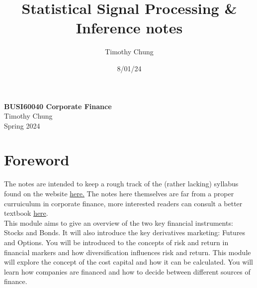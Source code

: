 \documentclass{report}
\title{Statistical Signal Processing \& Inference notes}
\author{Timothy Chung}
\date{8/01/24}
\begin{document}

\setlength{\cftsecnumwidth}{4.2em} 

\begin{titlepage}
\centering
    \vspace*{1cm}
    \Huge
    \textbf{BUSI60040 Corporate Finance} \\
    \vspace{1cm}
    \Large
    Timothy Chung \\
    \vspace{1cm}
    Spring 2024 \\
    \vfill
\end{titlepage}

\setcounter{tocdepth}{1}
\tableofcontents
\newpage
\setcounter{chapter}{-1}
\chapter{Foreword}
The notes are intended to keep a rough track of the (rather lacking) syllabus found on the website \href{https://www.imperial.ac.uk/business-school/undergraduate/bpes/#programme-content}{here.} The notes here themselves are far from a proper curruiculum in corporate finance, more interested readers can consult a better textbook \href{https://book.ivo-welch.info/home/}{here}. \\

This module aims to give an overview of the two key financial instruments: Stocks and Bonds. It will also introduce the key derivatives marketing: Futures and  Options. You will be introduced to the concepts of risk and return in  financial markers  and how diversification influences risk and return. This module will explore the concept of the cost capital and how it can be calculated. You will learn how companies are financed and how to decide between different sources of finance. 











\end{document}
